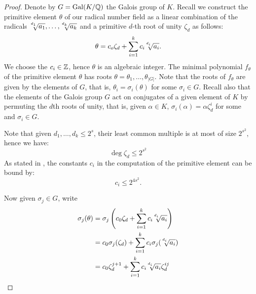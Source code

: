 \begin{proof}
Denote by $G = \operatorname{Gal}(K/\mathbb{Q})$ the Galois group of $K$. Recall we construct the primitive element $\theta$ of our radical number field as a linear combination of the radicals $\mysqrt{d_1}{a_1},\ldots,\mysqrt{d_k}{a_k}$ and a primitive $d$-th root of unity $\zeta_d$ as follows:
\[ \theta = c_o \zeta_d + \sum_{i=1}^k c_i \mysqrt{d_i}{a_i}. \]
We choose the $c_i\in\mathbb{Z}$, hence $\theta$ is an algebraic integer. The minimal polynomial $f_\theta$ of the primitive element $\theta$ has roots $\theta = \theta_1, \ldots, \theta_{|G|}$. Note that the roots of $f_\theta$ are given by the elements of $G$, that is, $\theta_i = \sigma_i(\theta)$ for some $\sigma_i \in G$. Recall also that the elements of the Galois group $G$ act on conjugates of a given element of $K$ by permuting the $d$th roots of unity, that is, given $\alpha \in K$, $\sigma_i(\alpha) = \alpha \zeta_d^i$ for some and $\sigma_i \in G$.

Note that given $d_1,\ldots,d_k \leq 2^s$,
their least common multiple is at most of size $2^{s^2}$,
hence we have:
\[ \deg \zeta_d \leq  2^{s^2}   \]
As stated in , the constants $c_i$ in the computation of the primitive element can be bound by:
\[ c_i \leq 2^{4s^2}. \]



Now given $\sigma_j\in G$, write
\begin{align*}
    \sigma_j(\theta) &= \sigma_j\left(c_0 \zeta_d + \sum_{i=1}^k c_i \mysqrt{d_i}{a_i}\right) \\
                     &= c_0 \sigma_j(\zeta_d) + \sum_{i=1}^k c_i \sigma_j(\mysqrt{d_i}{a_i})  \\
                     &= c_0 \zeta_d^{j+1} + \sum_{i=1}^k c_i \mysqrt{d_i}{a_i} \zeta_d^{ij}
\end{align*}


\end{proof}
